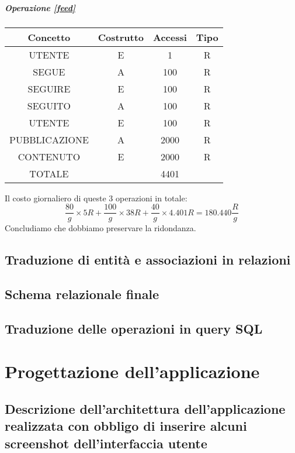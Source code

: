 \documentclass[a4paper,12pt]{report}
\begin{document}
\begin{table}[H]
\paragraph{Operazione \ref{feed}\newline}
\begin{tabular}{|c|c|c|c|}
\hline
Concetto      & Costrutto & Accessi & Tipo \\ \hline
UTENTE        & E         & 1       & R    \\ \hline
SEGUE         & A         & 100     & R    \\ \hline
SEGUIRE       & E         & 100     & R    \\ \hline
SEGUITO       & A         & 100     & R    \\ \hline
UTENTE        & E         & 100     & R    \\ \hline
PUBBLICAZIONE & A         & 2000    & R    \\ \hline
CONTENUTO     & E         & 2000    & R    \\ \hline
TOTALE        &           & 4401    &      \\ \hline
\end{tabular}
\end{table}
Il costo giornaliero di queste 3 operazioni in totale:
\begin{equation}
  \frac{80} g \times 5 R + \frac{100} g \times 38 R + \frac{40} g \times 4.401 R = 180.440 \frac{R} g 
\end{equation}
Concludiamo che dobbiamo preservare la ridondanza.
\section{Traduzione di entità e associazioni in relazioni}
\section{Schema relazionale finale}
\section{Traduzione delle operazioni in query SQL}
\chapter{Progettazione dell'applicazione}
\section{Descrizione dell'architettura dell'applicazione realizzata con obbligo di inserire alcuni screenshot dell'interfaccia utente}
\end{document}
